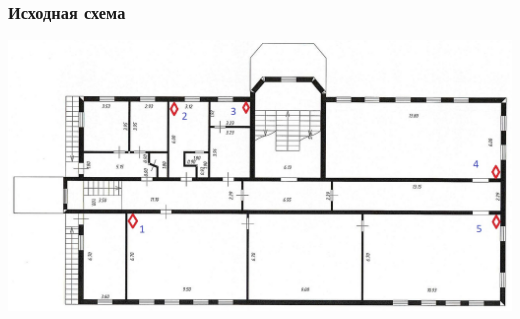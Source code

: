 \documentclass[aspectratio=169]{beamer}
\begin{document}
\begin{frame}
	\frametitle{Исходная схема}
	\includegraphics[width=\linewidth]{images/Исходная схема.jpg}
\end{frame}
\end{document}
